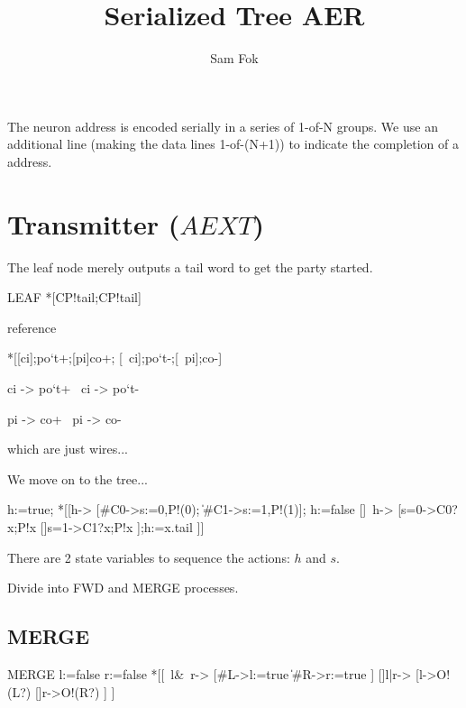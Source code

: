 \documentclass{article}
\begin{document}
\title{Serialized Tree AER}
\author{Sam Fok}
\maketitle

The neuron address is encoded serially in a series of 1-of-N groups. We use an additional line (making the data lines 1-of-(N+1)) to indicate the completion of a address.

\section{Transmitter ($AEXT$)}

The leaf node merely outputs a tail word to get the party started.

\begin{csp}
LEAF\equiv
  *[C\star\!P!\textrm{tail};C\star\!P!\textrm{tail}]
\end{csp}

reference
\begin{hse}
*[[ci];{po}`t+;[pi]co+;
  [~ci];{po}`t-;[~pi];co-]
\end{hse}

\begin{prs2}
ci -> {po}`t+
~ci -> {po}`t-

pi -> co+
~pi -> co-
\end{prs2}

\noindent which are just wires...

We move on to the tree...

\begin{csp}
h:=true;
*[[h->
    [#{C0}->s:=0,P!(0);
    \|#{C1}->s:=1,P!(1)];
    h:=false
  []~h->
    [s=0->C0?x;P!x
    []s=1->C1?x;P!x
    ];h:=x.tail
 ]]
\end{csp}

There are 2 state variables to sequence the actions: $h$ and $s$.

Divide into FWD and MERGE processes.

\subsection{MERGE}

\begin{csp}
MERGE\equiv
l:=false
r:=false
*[[~l&~r->
    [#{L}->l:=true
    \|#{R}->r:=true
    ]
  []l|r->
    [l->O!(L?)
    []r->O!(R?)
  ]
]
\end{csp}
\end{document}
